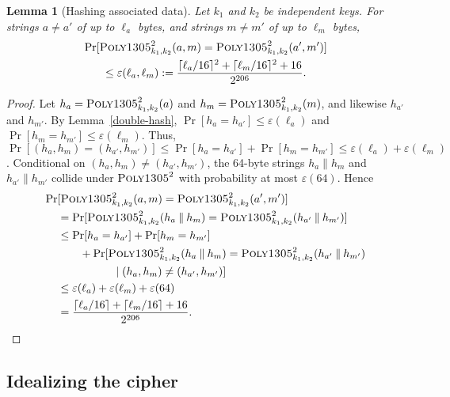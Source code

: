 \documentclass{article}
\newtheorem{lemma}{Lemma}
\def\operatorsc#1{{%
  \ifmmode\let\next=\operatorname\else\let\next=\relax\fi\next{\textsc{#1}}}}
\def\Poly#1/{\operatorsc{Poly#1}}
\newcommand{\concat}{\mathbin\|}
\newcommand{\given}{\mathrel|}
\newcommand{\collisionbound}{\varepsilon}
\begin{document}
\begin{lemma}[Hashing associated data]\label{hash-ad}
  Let $k_1$ and $k_2$ be independent \Poly1305/ keys.
  For strings $a \ne a'$ of up to $\ell_a$ bytes, and strings
   $m \ne m'$ of up to $\ell_m$ bytes,
%
  \begin{multline*}
    \Pr[\Poly1305/^2_{k_1,k_2}(a, m) = \Poly1305/^2_{k_1,k_2}(a', m')] \\
    \leq \collisionbound(\ell_a, \ell_m)
    := \frac{\lceil\ell_a/16\rceil^2 + \lceil\ell_m/16\rceil^2 + 16}
            {2^{206}}.
  \end{multline*}
\end{lemma}

\begin{proof}
  Let
   $h_a = \Poly1305/^2_{k_1,k_2}(a)$
   and
   $h_m = \Poly1305/^2_{k_1,k_2}(m)$,
   and likewise $h_{a'}$ and $h_{m'}$.
  By Lemma~\ref{double-hash},
   $\Pr[h_a = h_{a'}] \leq \collisionbound(\ell_a)$
   and
   $\Pr[h_m = h_{m'}] \leq \collisionbound(\ell_m)$.
  Thus,
   $\Pr[(h_a, h_m) = (h_{a'}, h_{m'})]
     \leq \Pr[h_a = h_{a'}] + \Pr[h_m = h_{m'}]
     \leq \collisionbound(\ell_a) + \collisionbound(\ell_m)$.
  Conditional on $(h_a, h_m) \ne (h_{a'}, h_{m'})$, the 64-byte
   strings $h_a \concat h_m$ and $h_{a'} \concat h_{m'}$ collide under
   $\Poly1305/^2$ with probability at most
   $\collisionbound(64)$.
  Hence
%
  \begin{align*}
    \Pr&[\Poly1305/^2_{k_1,k_2}(a, m) = \Poly1305/^2_{k_1,k_2}(a', m')] \\
    &= \Pr[\Poly1305/^2_{k_1,k_2}(h_a \concat h_m)
             = \Poly1305/^2_{k_1,k_2}(h_{a'} \concat h_{m'})] \\
    &\leq \Pr[h_a = h_{a'}] + \Pr[h_m = h_{m'}] \\
    &\qquad + \Pr[\Poly1305/^2_{k_1,k_2}(h_a \concat h_m)
                    = \Poly1305/^2_{k_1,k_2}(h_{a'} \concat h_{m'}) \\
    &\qquad\qquad\quad \given (h_a, h_m) \ne (h_{a'}, h_{m'})] \\
    &\leq \varepsilon(\ell_a) + \varepsilon(\ell_m)
          + \varepsilon(64) \\
    &= \frac{\lceil\ell_a/16\rceil + \lceil\ell_m/16\rceil + 16}
            {2^{206}}.
    \qedhere
  \end{align*}
\end{proof}

\subsection{Idealizing the cipher}
\end{document}
